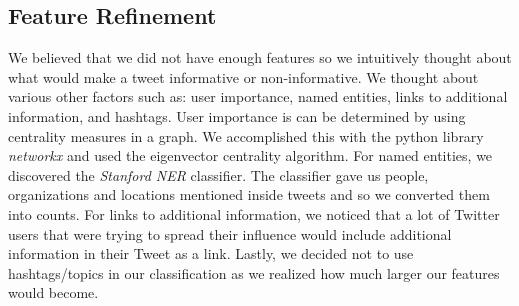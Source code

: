 \documentclass[12pt]{article}
\begin{document}
\subsection{Feature Refinement}
We believed that we did not have enough features so we intuitively thought about what would make a tweet informative or non-informative. We thought about various other factors such as: user importance, named entities, links to additional information, and hashtags. User importance is can be determined by using centrality measures in a graph. We accomplished this with the python library {\it networkx} and used the eigenvector centrality algorithm. For named entities, we discovered the {\it Stanford NER} classifier. The classifier gave us people, organizations and locations mentioned inside tweets and so we converted them into counts. For links to additional information, we noticed that a lot of Twitter users that were trying to spread their influence would include additional information in their Tweet as a link. Lastly, we decided not to use hashtags/topics in our classification as we realized how much larger our features would become.
\end{document}
